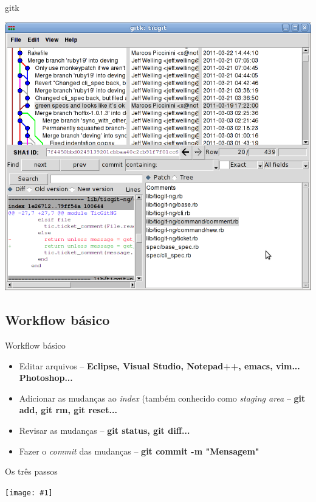 \documentclass[portuguese,brazil]{beamer}
\newcommand\img[1]{
  \begin{center}
    \texttt{[image: \#1]}
  \end{center}
}
\begin{document}
\begin{frame}{gitk}
\begin{center}
  \includegraphics[scale=.38]{images/gitkticgit.png}
\end{center}
\end{frame}

\subsection{Workflow básico}

\begin{frame}{Workflow básico}
  \begin{itemize}
    \item Editar arquivos
    \pause
    -- \textbf{Eclipse, Visual Studio, Notepad++, emacs, vim... Photoshop...}
    \pause
    \item Adicionar as mudanças ao \textit{index} (também conhecido como
      \textit{staging area}
    \pause
    -- \textbf{git add, git rm, git reset...}
    \pause
    \item Revisar as mudanças
    -- \textbf{git status, git diff...}
    \pause
    \item Fazer o \textit{commit} das mudanças
    -- \textbf{git commit -m "Mensagem"}
  \end{itemize}
\end{frame}

\begin{frame}{Os três passos}
  \img{images/three.png}
\end{frame}
\end{document}
